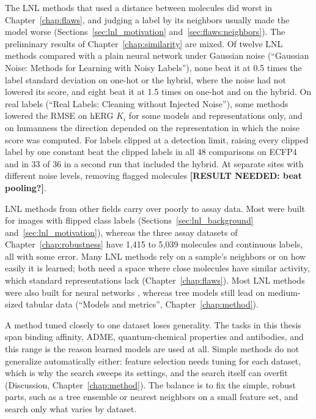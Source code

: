 The LNL methods that used a distance between molecules did worst in Chapter~\ref{chap:flaws}, and judging a label by its neighbors usually made the model worse (Sections~\ref{sec:lnl_motivation} and~\ref{sec:flaws:neighbors}). The preliminary results of Chapter~\ref{chap:similarity} are mixed. Of twelve LNL methods compared with a plain neural network under Gaussian noise (``Gaussian Noise: Methods for Learning with Noisy Labels''), none beat it at 0.5 times the label standard deviation on one-hot or the hybrid, where the noise had not lowered its score, and eight beat it at 1.5 times on one-hot and on the hybrid. On real labels (``Real Labels: Cleaning without Injected Noise''), some methods lowered the RMSE on hERG $K_i$ for some models and representations only, and on humanness the direction depended on the representation in which the noise score was computed. For labels clipped at a detection limit, raising every clipped label by one constant beat the clipped labels in all 48 comparisons on ECFP4 and in 33 of 36 in a second run that included the hybrid. At separate sites with different noise levels, removing flagged molecules \textbf{[RESULT NEEDED: beat pooling?]}.

LNL methods from other fields carry over poorly to assay data. Most were built for images with flipped class labels \citep{Song2022} (Sections~\ref{sec:lnl_background} and~\ref{sec:lnl_motivation}), whereas the three assay datasets of Chapter~\ref{chap:robustness} have 1,415 to 5,039 molecules and continuous labels, all with some error. Many LNL methods rely on a sample's neighbors or on how easily it is learned; both need a space where close molecules have similar activity, which standard representations lack (Chapter~\ref{chap:flaws}). Most LNL methods were also built for neural networks \citep{Song2022}, whereas tree models still lead on medium-sized tabular data \citep{Grinsztajn2022} (``Models and metrics'', Chapter~\ref{chap:method}).

A method tuned closely to one dataset loses generality. The tasks in this thesis span binding affinity, ADME, quantum-chemical properties and antibodies, and this range is the reason learned models are used at all. Simple methods do not generalize automatically either: feature selection needs tuning for each dataset, which is why the search sweeps its settings, and the search itself can overfit (Discussion, Chapter~\ref{chap:method}). The balance is to fix the simple, robust parts, such as a tree ensemble or nearest neighbors on a small feature set, and search only what varies by dataset.



